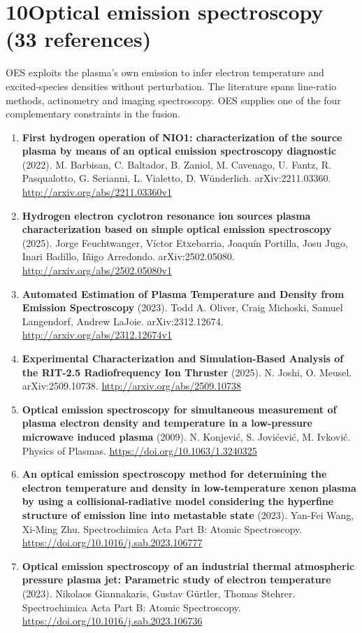 \documentclass[11pt,a4paper]{article}
\begin{document}
\section*{10\quad Optical emission spectroscopy \textnormal{(\normalsize 33 references)}}
OES exploits the plasma's own emission to infer electron temperature and excited-species densities without perturbation. The literature spans line-ratio methods, actinometry and imaging spectroscopy. OES supplies one of the four complementary constraints in the fusion.
\begin{enumerate}[leftmargin=1.4em]
\item \textbf{First hydrogen operation of NIO1: characterization of the source plasma by means of an optical emission spectroscopy diagnostic} (2022). M. Barbisan, C. Baltador, B. Zaniol, M. Cavenago, U. Fantz, R. Pasqualotto, G. Serianni, L. Vialetto, D. Wünderlich. arXiv:2211.03360. \url{http://arxiv.org/abs/2211.03360v1}
\item \textbf{Hydrogen electron cyclotron resonance ion sources plasma characterization based on simple optical emission spectroscopy} (2025). Jorge Feuchtwanger, Víctor Etxebarria, Joaquín Portilla, Josu Jugo, Inari Badillo, Iñigo Arredondo. arXiv:2502.05080. \url{http://arxiv.org/abs/2502.05080v1}
\item \textbf{Automated Estimation of Plasma Temperature and Density from Emission Spectroscopy} (2023). Todd A. Oliver, Craig Michoski, Samuel Langendorf, Andrew LaJoie. arXiv:2312.12674. \url{http://arxiv.org/abs/2312.12674v1}
\item \textbf{Experimental Characterization and Simulation-Based Analysis of the RIT-2.5 Radiofrequency Ion Thruster} (2025). N. Joshi, O. Meusel. arXiv:2509.10738. \url{http://arxiv.org/abs/2509.10738}
\item \textbf{Optical emission spectroscopy for simultaneous measurement of plasma electron density and temperature in a low-pressure microwave induced plasma} (2009). N. Konjević, S. Jovićević, M. Ivković. Physics of Plasmas. \url{https://doi.org/10.1063/1.3240325}
\item \textbf{An optical emission spectroscopy method for determining the electron temperature and density in low-temperature xenon plasma by using a collisional-radiative model considering the hyperfine structure of emission line into metastable state} (2023). Yan-Fei Wang, Xi-Ming Zhu. Spectrochimica Acta Part B: Atomic Spectroscopy. \url{https://doi.org/10.1016/j.sab.2023.106777}
\item \textbf{Optical emission spectroscopy of an industrial thermal atmospheric pressure plasma jet: Parametric study of electron temperature} (2023). Nikolaos Giannakaris, Gustav Gürtler, Thomas Stehrer. Spectrochimica Acta Part B: Atomic Spectroscopy. \url{https://doi.org/10.1016/j.sab.2023.106736}

\end{enumerate}
\end{document}
